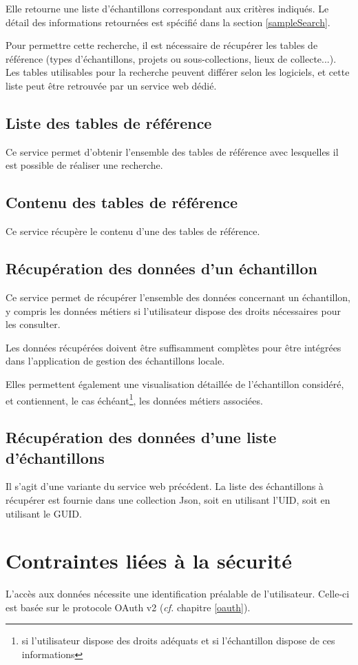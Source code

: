 Elle retourne une liste d'échantillons correspondant aux critères indiqués. Le détail des informations retournées est spécifié dans la section \ref{sampleSearch}.

Pour permettre cette recherche, il est nécessaire de récupérer les tables de référence (types d'échantillons, projets ou sous-collections, lieux de collecte...). Les tables utilisables pour la recherche peuvent différer selon les logiciels, et cette liste peut être retrouvée par un service web dédié.

\subsection{Liste des tables de référence}
Ce service permet d'obtenir l'ensemble des tables de référence avec lesquelles il est possible de réaliser une recherche.

\subsection{Contenu des tables de référence}
Ce service récupère le contenu d'une des tables de référence.

\subsection{Récupération des données d'un échantillon}
Ce service permet de récupérer l'ensemble des données concernant un échan\-tillon, y compris les données \og métiers \fg{} si l'utilisateur dispose des droits néces\-saires pour les consulter.

Les données récupérées doivent être suffisamment complètes pour être intégrées dans l'application de gestion des échantillons locale.

Elles permettent également une visualisation détaillée de l'échantillon consi\-déré, et contiennent, le cas échéant\footnote{si l'utilisateur dispose des droits adéquats et si l'échantillon dispose de ces informations}, les données \og métiers \fg{} associées.

\subsection{Récupération des données d'une liste d'échantillons}

Il s'agit d'une variante du service web précédent. La liste des échantillons à récupérer est fournie dans une collection Json, soit en utilisant l'UID, soit en utilisant le GUID.

\section{Contraintes liées à la sécurité}

L'accès aux données nécessite une identification préalable de l'utilisateur. Celle-ci est basée sur le protocole OAuth v2 (\textit{cf.} chapitre \ref{oauth}).

